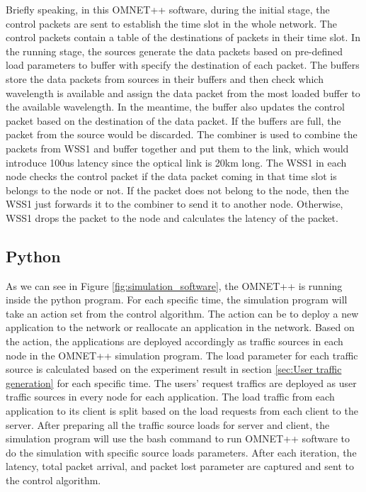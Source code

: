 \documentclass[conference]{IEEEtran}
\begin{document}
Briefly speaking, in this OMNET++ software, during the initial stage, the control packets are sent to establish the time slot in the whole network. The control packets contain a table of the destinations of packets in their time slot. In the running stage, the sources generate the data packets based on pre-defined load parameters to buffer with specify the destination of each packet. The buffers store the data packets from sources in their buffers and then check which wavelength is available and assign the data packet from the most loaded buffer to the available wavelength. In the meantime, the buffer also updates the control packet based on the destination of the data packet. If the buffers are full, the packet from the source would be discarded. The combiner is used to combine the packets from WSS1 and buffer together and put them to the link, which would introduce 100us latency since the optical link is 20km long. The WSS1 in each node checks the control packet if the data packet coming in that time slot is belongs to the node or not. If the packet does not belong to the node, then the WSS1 just forwards it to the combiner to send it to another node. Otherwise, WSS1 drops the packet to the node and calculates the latency of the packet.

\subsection{Python}

As we can see in Figure \ref{fig:simulation_software}, the OMNET++ is running inside the python program. For each specific time, the simulation program will take an action set from the control algorithm. The action can be to deploy a new application to the network or reallocate an application in the network. Based on the action, the applications are deployed accordingly as traffic sources in each node in the OMNET++ simulation program. The load parameter for each traffic source is calculated based on the experiment result in section \ref{sec:User traffic generation} for each specific time. The users' request traffics are deployed as user traffic sources in every node for each application. The load traffic from each application to its client is split based on the load requests from each client to the server. After preparing all the traffic source loads for server and client, the simulation program will use the bash command to run OMNET++ software to do the simulation with specific source loads parameters. After each iteration, the latency, total packet arrival, and packet lost parameter are captured and sent to the control algorithm.
\end{document}
